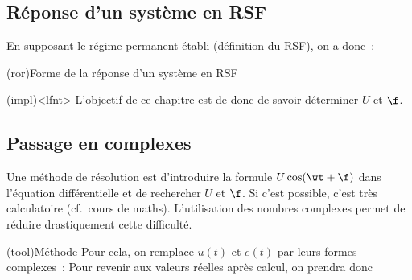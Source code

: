 \documentclass[../../main/main.tex]{subfiles}
\begin{document}
\subsection{Réponse d'un système en RSF}
En supposant le régime permanent établi (définition du RSF), on a donc~:
\begin{tcb}[label=prop:sortiersf](ror){Forme de la réponse d'un système en RSF}
\end{tcb}
\begin{tcb}(impl)<lfnt>{}
	L'objectif de ce chapitre est de donc de savoir déterminer $U$ et $\f$.
\end{tcb}
\subsection{Passage en complexes}
Une méthode de résolution est d'introduire la formule $U\cos(\wt+\f)$ dans
l'équation différentielle et de rechercher $U$ et $\f$. Si c'est possible, c'est
très calculatoire (cf.\ cours de maths). L'utilisation des nombres complexes
permet de réduire drastiquement cette difficulté.

\begin{tcb}(tool){Méthode}
	Pour cela, on remplace $u(t)$ et $e(t)$ par leurs formes complexes~:
	Pour revenir aux valeurs réelles après calcul, on prendra donc
\end{tcb}
\end{document}
